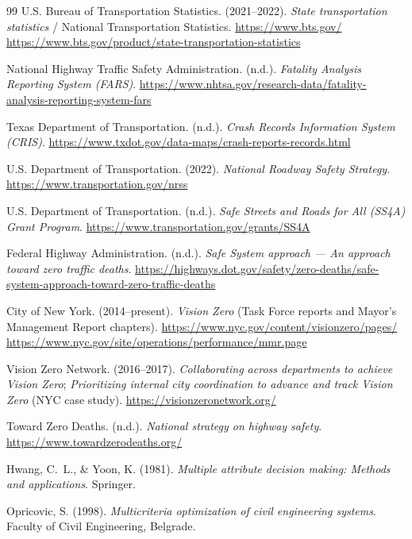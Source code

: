 \documentclass{article}
\begin{document}
\begin{thebibliography}{99}
U.S. Bureau of Transportation Statistics. (2021--2022).
\textit{State transportation statistics} / National Transportation Statistics.
\url{https://www.bts.gov/}
\url{https://www.bts.gov/product/state-transportation-statistics}

National Highway Traffic Safety Administration. (n.d.).
\textit{Fatality Analysis Reporting System (FARS)}.
\url{https://www.nhtsa.gov/research-data/fatality-analysis-reporting-system-fars}

Texas Department of Transportation. (n.d.).
\textit{Crash Records Information System (CRIS)}.
\url{https://www.txdot.gov/data-maps/crash-reports-records.html}

U.S. Department of Transportation. (2022).
\textit{National Roadway Safety Strategy}.
\url{https://www.transportation.gov/nrss}

U.S. Department of Transportation. (n.d.).
\textit{Safe Streets and Roads for All (SS4A) Grant Program}.
\url{https://www.transportation.gov/grants/SS4A}

Federal Highway Administration. (n.d.).
\textit{Safe System approach --- An approach toward zero traffic deaths}.
\url{https://highways.dot.gov/safety/zero-deaths/safe-system-approach-toward-zero-traffic-deaths}

City of New York. (2014--present).
\textit{Vision Zero} (Task Force reports and Mayor's Management Report chapters).
\url{https://www.nyc.gov/content/visionzero/pages/}
\url{https://www.nyc.gov/site/operations/performance/mmr.page}

Vision Zero Network. (2016--2017).
\textit{Collaborating across departments to achieve Vision Zero};
\textit{Prioritizing internal city coordination to advance and track Vision Zero} (NYC case study).
\url{https://visionzeronetwork.org/}

Toward Zero Deaths. (n.d.).
\textit{National strategy on highway safety}.
\url{https://www.towardzerodeaths.org/}

Hwang, C.~L., \& Yoon, K. (1981).
\textit{Multiple attribute decision making: Methods and applications}.
Springer.

Opricovic, S. (1998).
\textit{Multicriteria optimization of civil engineering systems}.
Faculty of Civil Engineering, Belgrade.

\end{thebibliography}
\end{document}

